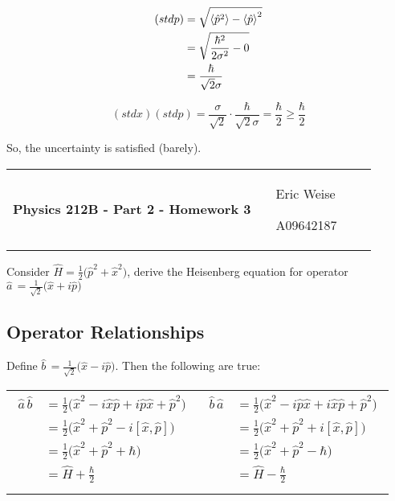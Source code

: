 \documentclass{article}
\newcommand{\assignment}[2]{
    \newpage
    \begin{tabular}{p{0.65\linewidth}p{0.25\linewidth}}
        {\bf\LARGE Physics 212B - Part #1 - Homework #2 }
        &
        \parbox[b]{0.24\textwidth}{
            \hfill Eric Weise

            \hfill A09642187
            }
    \end{tabular}
    \vspace{12pt}
    \newline
}
\renewcommand{\exp}[1]{\,\text{exp} \big\{ #1 \big\} }
\begin{document}
\begin{align*}
    (stdp) 
    &= \sqrt{\braket{\hat{p}^2} - \braket{\hat{p}}^2} \\
    &= \sqrt{\frac{\hbar^2}{2\sigma^2} - 0} \\
    &= \frac{\hbar}{\sqrt{2}\sigma}
\end{align*}

\[ (stdx)(stdp)
    = \frac{\sigma}{\sqrt{2}} \cdot \frac{\hbar}{\sqrt{2}\sigma}
    = \frac{\hbar}{2} 
    \ge \frac{\hbar}{2} \]

So, the uncertainty is satisfied (barely).


\assignment{2}{3}
\renewcommand{\exp}[1]{ \, e^{#1} \, }
\newcommand{\aop}[0]{ \hat{a} \, }
\newcommand{\bop}[0]{ \hat{b} \, }

Consider
\( \hat{H} = \frac{1}{2}\big(\hat{p}^2 + \hat{x}^2\big) \),
derive the Heisenberg equation for operator
\( \aop = \frac{1}{\sqrt{2}} \big( \hat{x} + i \hat{p} \big) \)

 \subsection*{Operator Relationships}
 Define 
 \( \bop = \frac{1}{\sqrt{2}} \big( \hat{x} - i \hat{p} \big)\).
 Then the following are true:

 \begin{tabular}{cc}
     \parbox[b]{0.45\textwidth}{
         \begin{align*}
             \aop\bop
             &= \frac{1}{2} \big( \hat{x}^2 - i \hat{x}\hat{p} + i \hat{p}\hat{x} + \hat{p}^2 \big) \\
             &= \frac{1}{2} \big( \hat{x}^2  + \hat{p}^2 -i [\hat{x},\hat{p}] \big) \\
             &= \frac{1}{2} \big( \hat{x}^2  + \hat{p}^2 + \hbar \big) \\
             &= \hat{H} + \frac{\hbar}{2} \\
         \end{align*}
     }
    &
    \parbox[b]{0.45\textwidth}{ 
         \begin{align*}
             \bop\aop
             &= \frac{1}{2} \big( \hat{x}^2 - i \hat{p}\hat{x} + i \hat{x}\hat{p} + \hat{p}^2 \big) \\
             &= \frac{1}{2} \big( \hat{x}^2  + \hat{p}^2 +i [\hat{x},\hat{p}] \big) \\
             &= \frac{1}{2} \big( \hat{x}^2  + \hat{p}^2 - \hbar \big) \\
             &= \hat{H} - \frac{\hbar}{2} \\
         \end{align*}
     }
 \end{tabular}
\end{document}

